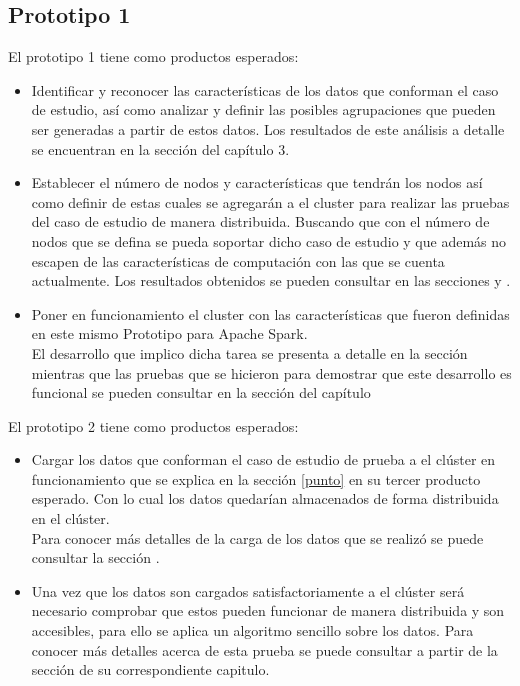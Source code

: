 \subsection{Prototipo 1}
El prototipo 1 tiene como productos esperados:
\begin{itemize}
	\item Identificar y reconocer las características de los datos que conforman el caso de estudio, así como analizar y definir las posibles agrupaciones que pueden ser generadas a partir de estos datos. Los resultados de este análisis a detalle se encuentran en la sección  del capítulo 3.\\ 
	\item Establecer el número de nodos y características que tendrán los nodos así como definir de estas cuales se agregarán a el cluster para realizar las pruebas del caso de estudio de manera  distribuida.
	Buscando que con el número de nodos que se defina se pueda soportar dicho caso de estudio y que además no escapen de las características de computación con las que se cuenta actualmente.
	Los resultados obtenidos se pueden consultar en las secciones  y .
	\item Poner en funcionamiento el cluster con las características que fueron definidas en este mismo Prototipo para Apache Spark. \label{punto}
	\\
	El desarrollo que implico dicha tarea se presenta a detalle en la sección  mientras que las pruebas que se hicieron para demostrar que este desarrollo es funcional se pueden consultar en la sección  del capítulo 
\end{itemize} 
El prototipo 2 tiene como productos esperados: 
\begin{itemize} 
    \item Cargar los datos que conforman el caso de estudio de prueba a el clúster en funcionamiento que se explica en la sección \ref{punto} en su tercer producto esperado. Con lo cual los datos quedarían almacenados de forma distribuida en el clúster. 
    \\ 
    Para conocer más detalles de la carga de los datos que se realizó se puede consultar la sección .     
    \item Una vez que los datos son cargados satisfactoriamente a el clúster será necesario comprobar que estos pueden funcionar de manera distribuida y son accesibles, para ello se aplica un algoritmo sencillo sobre los datos. Para conocer más detalles acerca de esta prueba se puede consultar a partir de la sección   de su correspondiente capitulo. 
\end{itemize}   
